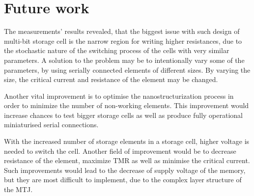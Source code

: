 \chapter{Future work}
\label{sec:FutureWork}

    The measurements' results revealed, that the biggest issue with such design of multi-bit storage cell is the narrow region for writing higher resistances, due to the stochastic nature of the switching process of the cells with very similar parameters. A solution to the problem may be to intentionally vary some of the parameters, by using serially connected elements of different sizes. By varying the size, the critical current and resistance of the element may be changed.

    Another vital improvement is to optimise the nanostructurization process in order to minimize the number of non-working elements. This improvement would increase chances to test bigger storage cells as well as produce fully operational miniaturised serial connections.

    With the increased number of storage elements in a storage cell, higher voltage is needed to switch the cell. Another field of improvement would be to decrease resistance of the element, maximize TMR as well as minimise the critical current. Such improvements would lead to the decrease of supply voltage of the memory, but they are most difficult to implement, due to the complex layer structure of the MTJ.
